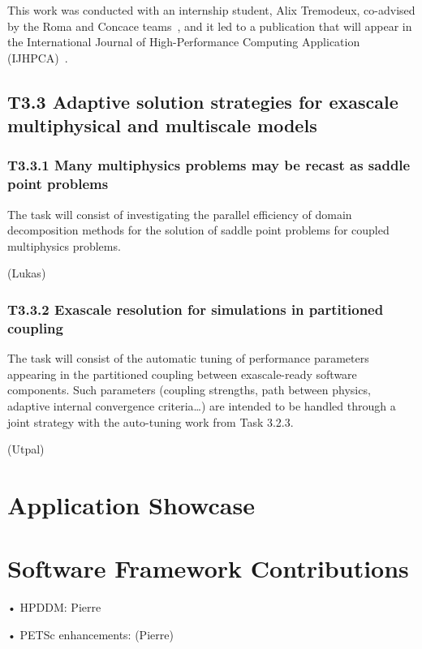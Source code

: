   This work was conducted with an internship student, Alix Tremodeux, co-advised by the Roma and Concace teams~\cite{tremodeux:hal-04872041}, and it led to a publication that will appear in the International Journal of High-Performance Computing Application (IJHPCA)~\cite{tremodeux:hal-05234063}.

 
 \subsection{ 
T3.3 Adaptive solution strategies for exascale multiphysical and multiscale models
 }

\subsubsection{ 
 T3.3.1 Many multiphysics problems may be recast as saddle point problems
 }
  The task will consist of investigating the parallel efficiency of domain decomposition methods for the solution of saddle point problems for coupled multiphysics problems.

(Lukas) 

\subsubsection{ 
T3.3.2 Exascale resolution for simulations in partitioned coupling
}
 The task will consist of the
automatic tuning of performance parameters appearing in the partitioned coupling between
exascale-ready software components. Such parameters (coupling strengths, path between physics,
adaptive internal convergence criteria…) are intended to be handled through a joint strategy with the
auto-tuning work from Task 3.2.3.

 (Utpal)


\section{Application Showcase}
%   

\section{Software Framework Contributions}
 • HPDDM: Pierre
 
 • PETSc enhancements: (Pierre)
 

